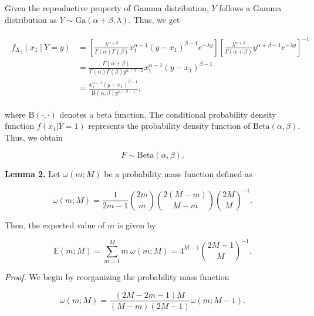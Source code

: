 \documentclass[11pt, class=article, crop=false]{standalone}
\begin{document}
Given the reproductive property of Gamma distribution, $Y$ follows a Gamma distribution as $Y \sim \mbox{Ga}(\alpha + \beta, \lambda)$.
Thus, we get

\begin{align}
    \begin{split}
        f_{X_1}(x_1~|~Y = y)
        &= 
        \left[
            \frac{\lambda^{\alpha + \beta}}{\Gamma(\alpha) \Gamma(\beta)}x_1^{\alpha - 1} (y - x_1)^{\beta - 1} e^{-\lambda y}
        \right]
        \left[
            \frac{\lambda^{\alpha + \beta}}{\Gamma(\alpha + \beta)} y^{\alpha + \beta - 1} e^{-\lambda y}
        \right]^{-1}\\
        &= \frac{\Gamma(\alpha + \beta)}{\Gamma(\alpha) \Gamma(\beta) y^{\alpha + \beta - 1}} x_1^{\alpha - 1} (y - x_1)^{\beta - 1}\\
        &= \frac{x_1^{\alpha - 1} (y - x_1)^{\beta - 1}}{\mbox{B}(\alpha, \beta) y^{\alpha + \beta - 1}},
    \end{split}
    \label{eq:dbeta}
\end{align}

where $\mbox{B}(\cdot, \cdot)$ denotes a beta function.
The conditional probability density function $f(x_1 | Y = 1)$ represents the probability density function of $\mbox{Beta}(\alpha, \beta)$.
Thus, we obtain

\begin{equation}
    F \sim \mbox{Beta}(\alpha, \beta).
\end{equation}

\textbf{Lemma 2.}
Let $\omega(m; M)$ be a probability mass function defined as

\begin{equation}
    \omega(m; M) = \frac{1}{2m - 1} \binom{2m}{m} \binom{2(M - m)}{M - m} \binom{2M}{M}^{-1}.
\end{equation}

Then, the expected value of $m$ is given by

\begin{equation}
    \mathbb{E}(m; M) = \sum_{m = 1}^M m~\omega(m; M) = 4^{M-1} \binom{2M-1}{M}^{-1}.
\end{equation}

\textit{Proof.}  
We begin by reorganizing the probability mass function

\begin{equation}
    \omega(m; M) = \frac{(2M - 2m - 1) M}{(M - m)(2M - 1)} \omega(m; M - 1).
\end{equation}
\end{document}
